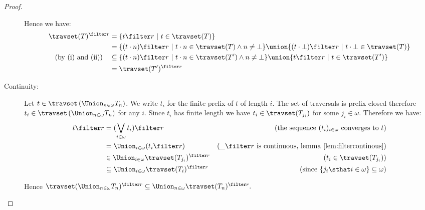 \begin{proof}
\begin{description}
        Hence we have:
        \begin{align*}
        \travset(T)^{\filter r} &= \{ t \filter r \ | \ t \in \travset(T)     \} \\
        & = \{ (t\cdot n) \filter r \ | \ t\cdot n \in \travset(T) \wedge n \neq \bot \}
            \union \{ (t \cdot \bot ) \filter r \ | \ t \cdot \bot \in \travset(T)  \} \\
\mbox{(by (i) and (ii))} \quad        & \subseteq  \{ (t\cdot n)
\filter r \ | \ t\cdot n \in \travset(T') \wedge n \neq \bot
\}
            \union \{ t \filter r \ | \ t \in \travset(T')  \} \\
        & = \travset(T')^{\filter r}
        \end{align*}

        \item[Continuity:] Let $t \in \travset \left( \Union_{n\in\omega} T_n \right)$.
        We write $t_i$ for the finite prefix of $t$ of length $i$.
        The set of traversals is prefix-closed therefore $t_i \in \travset \left( \Union_{n\in\omega} T_n \right)$ for any $i$.
        Since $t_i$ has finite length we have $t_i \in \travset(T_{j_i})$ for some $j_i \in \omega$.
        Therefore we have:
        \begin{align*}
          t \filter r &= (\bigvee_{i\in\omega} t_i ) \filter r   & (\mbox{the sequence $(t_i)_{i\in\omega}$ converges to $t$}) \\
          &= \Union_{i\in\omega} ( t_i \filter r )   & (\_ \filter r \mbox{ is continuous, lemma \ref{lem:filtercontinous}}) \\
          &\in \Union_{i\in\omega} \travset(T_{j_i})^{\filter r}   & (t_i \in \travset(T_{j_i})) \\
          &\subseteq \Union_{i\in\omega} \travset(T_i)^{\filter r}   & (\mbox{since } \{ j_i \sthat i \in \omega \} \subseteq \omega)
        \end{align*}

        Hence $\travset(\Union_{n\in\omega} T_n )^{\filter r} \subseteq \Union_{n\in\omega} \travset(T_n)^{\filter r}.$

    \end{description}
\end{proof}

